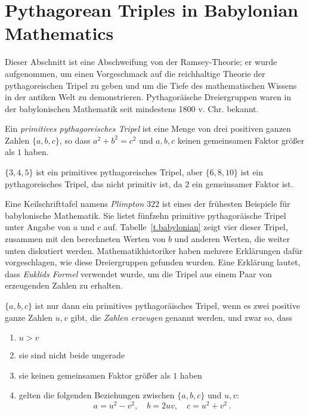 \section{Pythagorean Triples in Babylonian Mathematics}\label{s.plimpton}

Dieser Abschnitt ist eine Abschweifung von der Ramsey-Theorie; er wurde aufgenommen, um einen Vorgeschmack auf die reichhaltige Theorie der pythagoreischen Tripel zu geben und um die Tiefe des mathematischen Wissens in der antiken Welt zu demonstrieren. Pythagoräische Dreiergruppen waren in der babylonischen Mathematik seit mindestens 1800 v. Chr. bekannt.
\begin{definition}
Ein \emph{primitives pythagoreisches Tripel} ist eine Menge von drei positiven ganzen Zahlen $\{a,b,c\}$, so dass $a^2+b^2=c^2$ und $a,b,c$ keinen gemeinsamen Faktor größer als $1$ haben.
\end{definition}
\begin{example}
$\{3,4,5\}$ ist ein primitives pythagoreisches Tripel, aber $\{6,8,10\}$ ist ein pythagoreisches Tripel, das nicht primitiv ist, da $2$ ein gemeinsamer Faktor ist.
\end{example}
Eine Keilschrifttafel namens \emph{Plimpton $322$} ist eines der frühesten Beispiele für babylonische Mathematik. Sie listet fünfzehn primitive pythagoräische Tripel unter Angabe von $a$ und $c$ auf. Tabelle~\ref{t.babylonian} zeigt vier dieser Tripel, zusammen mit den berechneten Werten von $b$ und anderen Werten, die weiter unten diskutiert werden. Mathematikhistoriker haben mehrere Erklärungen dafür vorgeschlagen, wie diese Dreiergruppen gefunden wurden. Eine Erklärung lautet, dass \emph{Euklids Formel} verwendet wurde, um die Tripel aus einem Paar von erzeugenden Zahlen zu erhalten.
\begin{theorem}[Euclid]
$\{a,b,c\}$ ist nur dann ein primitives pythagoräisches Tripel, wenn es zwei positive ganze Zahlen $u,v$ gibt, die \emph{Zahlen erzeugen} genannt werden, und zwar so, dass\label{thm.euclid-function}
\begin{enumerate}
\item $u>v$
\item sie sind nicht beide ungerade
\item sie keinen gemeinsamen Faktor größer als $1$ haben
\item gelten die folgenden Beziehungen zwischen $\{a,b,c\}$ und $u,v$:
\[
a=u^2-v^2,\quad b=2uv,\quad c=u^2+v^2\,.
\]
\end{enumerate}
\end{theorem}

